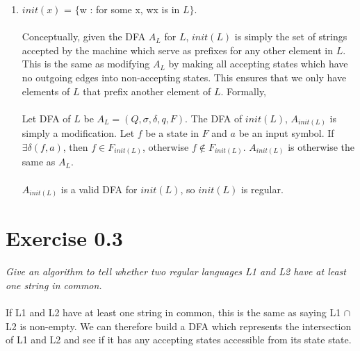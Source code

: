\documentclass[a4paper]{article}
\begin{document}
\begin{enumerate}
\item $init(x)$ = $\{$w : for some x, wx is in $L\}$. \\
\\
Conceptually, given the DFA $A_{L}$ for $L$, $init(L)$ is simply the set of strings accepted by the machine which serve as prefixes for any other element in $L$. This is the same as modifying $A_{L}$ by making all accepting states which have no outgoing edges into non-accepting states. This ensures that we only have elements of $L$ that prefix another element of $L$. Formally,\\
\\
Let DFA of $L$ be $A_{L} = (Q, \sigma, \delta, q, F)$. The DFA of $init(L)$, $A_{init(L)}$ is simply a modification. Let $f$ be a state in $F$ and $a$ be an input symbol. If $\exists \delta(f,a)$, then $f \in F_{init(L)}$, otherwise $f \notin F_{init(L)}$. $A_{init(L)}$ is otherwise the same as $A_{L}$. \\
\\
$A_{init(L)}$ is a valid DFA for $init(L)$, so $init(L)$ is regular.
\\

\end{enumerate}



\section{Exercise 0.3}
\emph{Give an algorithm to tell whether two regular languages L1 and L2 have at least one string in common.} \\
\\
If L1 and L2 have at least one string in common, this is the same as saying L1 $\cap$ L2 is non-empty. We can therefore build a DFA which represents the intersection of L1 and L2 and see if it has any accepting states accessible from its state state.
\end{document}
